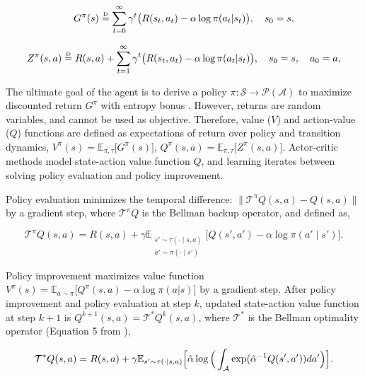 \documentclass[10pt]{article} %
\newcommand\disteq{\mathrel{\stackrel{\makebox[0pt]{\mbox{\normalfont\tiny D}}}{=}}}
\begin{document}
\begin{equation}
	\label{eqn:value_defn}
	G^{\pi}(s) \disteq \sum_{t=0}^{\infty} \gamma^{t} \big( R(s_t, a_t) - \alpha \log \pi(a_t|s_t) \big), \quad s_0=s, 
\end{equation}

\begin{equation}
	\label{eqn:maxent_zreturn_defn}
	Z^{\pi}(s, a) \disteq R(s, a) + \sum_{t=1}^{\infty} \gamma^{t} \big( R(s_t, a_t) - \alpha \log \pi(a_t|s_t) \big) , \quad s_0=s, \quad  a_0=a,  
\end{equation}

The ultimate goal of the agent is to derive a policy $\pi: \mathcal{S} \rightarrow \mathcal{P}(\mathcal{A})$ to maximize discounted return $G^{\pi}$ with entropy bonus \citep{haarnoja2017reinforcement, haarnoja2018soft}. However, returns are random variables, and cannot be used as objective. Therefore, value ($V$) and action-value ($Q$) functions are defined as expectations of return over policy and transition dynamics, $V^{\pi}(s) = \mathbb{E}_{\pi,\tau} \big[ G^{\pi}(s) \big]$, $Q^{\pi}(s, a) = \mathbb{E}_{\pi,\tau} \big[ Z^{\pi}(s, a) \big]$. Actor-critic methods model state-action value function $Q$, and learning iterates between solving policy evaluation and policy improvement. 

Policy evaluation minimizes the temporal difference: $\big\| \mathcal{T}^{\pi} Q(s, a) - Q(s, a) \big\|$ by a gradient step, where $\mathcal{T}^{\pi} Q$ is the Bellman backup operator, and defined as, 

\begin{equation}
	\label{eqn:q_eval}
	\mathcal{T}^{\pi} Q(s,a) = R(s,a) + \gamma \mathbb{E}_{\substack{s'\sim\tau(\cdot \mid s,a) \\ a' \sim \pi(\cdot \mid s')}} \big[ Q(s',a') - \alpha \log \pi(a' \mid s') \big]. 
\end{equation}

Policy improvement maximizes value function $V^{\pi}(s)=\mathbb{E}_{a\sim\pi } \Big[ Q^{\pi}(s,a) - \alpha \log \pi(a|s) \Big]$ by a gradient step. After policy improvement and policy evaluation at step $k$, updated state-action value function at step $k+1$ is $Q^{k+1}(s,a) = \mathcal{T}^{*} Q^{k}(s,a)$, where $\mathcal{T}^{*}$ is the Bellman optimality operator (Equation 5 from \citet{haarnoja2017reinforcement}), 

\begin{equation}
	\label{eqn:q_optimal}
	\mathcal{T}^{*} Q(s,a) = R(s,a) + \gamma \mathbb{E}_{s'\sim\tau(\cdot \mid s,a)} \Big[ \Tilde{\alpha} \log \Big( \int_{\mathcal{A}} \exp({\Tilde{\alpha}}^{-1} {Q}(s',a')) da' \Big) \Big]. 
\end{equation}
\end{document}
